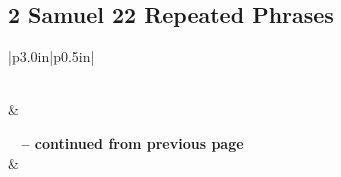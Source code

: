 \subsection{2 Samuel 22 Repeated Phrases}


\normalsize
 
\begin{center}
\begin{longtable}{|p{3.0in}|p{0.5in}|}
\caption[2 Samuel 22 Repeated Phrases]{2 Samuel 22 Repeated Phrases}\label{table:Repeated Phrases 2 Samuel 22} \\
\hline {} &  \\ \hline 
\endfirsthead
 
{{\bfseries \tablename\ \thetable{} -- continued from previous page}} \\  
\hline {} &  \\ \hline 
\endhead
 

\end{longtable}
\end{center}
